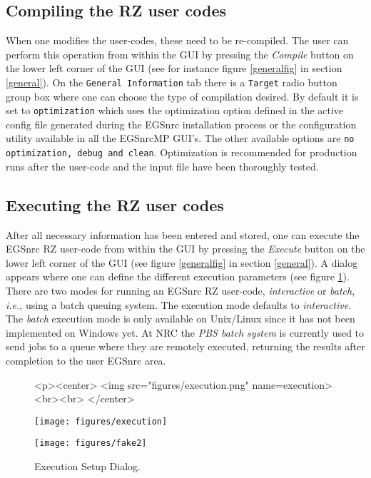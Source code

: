 \documentclass[12pt,twoside]{article}   %
\newcommand{\ie}{{\em i.e.}}
\begin{document}
\subsection{Compiling the RZ user codes}

When one modifies the user-codes, these need to be re-compiled.
The user can perform
this operation from within the GUI by pressing the {\em Compile} button on the  lower left
corner of the GUI (see for instance figure \ref{generalfig} in section \ref{general}).
On the {\tt General Information} tab there is a {\tt Target} radio button group box where
one can choose the type of compilation desired. By default it is set to {\tt optimization}
which uses the optimization option defined in the active config file generated during the
EGSnrc installation process or the configuration utility available in all the EGSnrcMP GUI's.
The other available options are {\tt no optimization, debug and clean}.
Optimization is recommended for production runs after the user-code
and the input file have been thoroughly tested.

\subsection{Executing the RZ user codes}

After all necessary information has been entered and stored, one can execute the EGSnrc
RZ user-code from within the GUI by pressing the {\em Execute} button on the  lower left
corner of the GUI (see figure \ref{generalfig} in section \ref{general}). A dialog appears
where one can define the different execution parameters (see figure \ref{execution}).
There are two modes for running an EGSnrc RZ user-code, {\it interactive} or {\it batch}, \ie,
using a batch queuing system. The execution mode defaults to {\it interactive}.
The {\it batch} execution mode is only available on Unix/Linux since it has not
been implemented on Windows yet.
At NRC the {\em PBS batch system} is currently used to send jobs to a queue where
they are remotely executed, returning the results after completion to the
user EGSnrc area.

\begin{figure}[h]
\begin{htmlonly}
\begin{rawhtml}
<p><center>
<img src="figures/execution.png" name=execution><br><br>
</center>
\end{rawhtml}
\end{htmlonly}
\begin{latexonly}
\begin{center}
\texttt{[image: figures/execution]}
\end{center}
\end{latexonly}
\begin{center}
\texttt{[image: figures/fake2]}
\end{center}
\caption{Execution Setup Dialog.}
\label{execution}
\end{figure}
\end{document}
